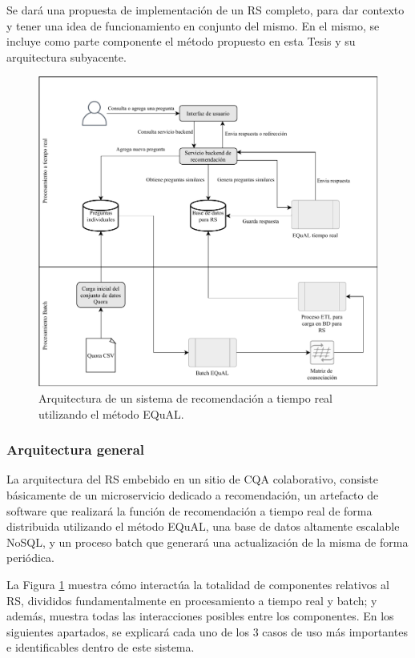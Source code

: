 \bigskip Se dará una propuesta de implementación de un RS completo, para dar contexto y tener una idea de funcionamiento en conjunto del mismo. En el mismo, se incluye como parte componente el método propuesto en esta Tesis y su arquitectura subyacente.

\bigskip
\begin{figure}[h!]
	\centering
	\includegraphics[width=0.9\linewidth]{8_problema_investigacion/imagenes/implementacion_rs}
	\caption{Arquitectura de un sistema de recomendación a tiempo real utilizando el método EQuAL.}
	\label{fig:implementacionrs}
\end{figure}

\subsubsection{Arquitectura general}
La arquitectura del RS embebido en un sitio de CQA colaborativo, consiste básicamente de un microservicio dedicado a recomendación, un artefacto de software que realizará la función de recomendación a tiempo real de forma distribuida utilizando el método EQuAL, una base de datos altamente escalable NoSQL, y un proceso batch que generará una actualización de la misma de forma periódica.

La Figura \ref{fig:implementacionrs} muestra cómo interactúa la totalidad de componentes relativos al RS, divididos fundamentalmente en procesamiento a tiempo real y batch; y además, muestra todas las interacciones posibles entre los componentes. En los siguientes apartados, se explicará cada uno de los 3 casos de uso más importantes e identificables dentro de este sistema.

